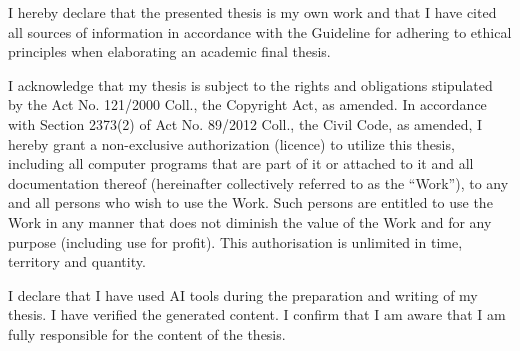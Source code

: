 \documentclass[english,bachelor,unicode,oneside]{ctufit-thesis}
\begin{document}
\begin{declarationpage}
I hereby declare that the presented thesis is my own work and that I have cited all sources of
information in accordance with the Guideline for adhering to ethical principles when elaborating an
academic final thesis.

I acknowledge that my thesis is subject to the rights and obligations stipulated by the Act No.
121/2000 Coll., the Copyright Act, as amended. In accordance with Section 2373(2) of Act No.
89/2012 Coll., the Civil Code, as amended, I hereby grant a non-exclusive authorization (licence) to
utilize this thesis, including all computer programs that are part of it or attached to it and all
documentation thereof (hereinafter collectively referred to as the ``Work''), to any and all persons
who wish to use the Work. Such persons are entitled to use the Work in any manner that does not
diminish the value of the Work and for any purpose (including use for profit). This authorisation is
unlimited in time, territory and quantity.

I declare that I have used AI tools during the preparation and writing of my thesis. I have verified
the generated content. I confirm that I am aware that I am fully responsible for the content of the
thesis.
\end{declarationpage}

\printabstractpage %
\end{document}
